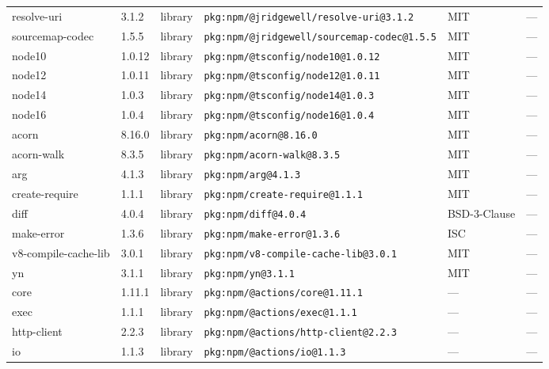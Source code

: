 \documentclass[11pt,a4paper]{article}
\begin{document}
\begin{longtable}{|p{4cm}|p{2cm}|p{1.6cm}|p{5cm}|p{1.5cm}|p{3.5cm}|}
\raggedright resolve-uri & 3.1.2 & library & \small\texttt{pkg:npm/@jridgewell/resolve-uri@3.1.2} & MIT & \small — \\
\raggedright sourcemap-codec & 1.5.5 & library & \small\texttt{pkg:npm/@jridgewell/sourcemap-codec@1.5.5} & MIT & \small — \\
\raggedright node10 & 1.0.12 & library & \small\texttt{pkg:npm/@tsconfig/node10@1.0.12} & MIT & \small — \\
\raggedright node12 & 1.0.11 & library & \small\texttt{pkg:npm/@tsconfig/node12@1.0.11} & MIT & \small — \\
\raggedright node14 & 1.0.3 & library & \small\texttt{pkg:npm/@tsconfig/node14@1.0.3} & MIT & \small — \\
\raggedright node16 & 1.0.4 & library & \small\texttt{pkg:npm/@tsconfig/node16@1.0.4} & MIT & \small — \\
\raggedright acorn & 8.16.0 & library & \small\texttt{pkg:npm/acorn@8.16.0} & MIT & \small — \\
\raggedright acorn-walk & 8.3.5 & library & \small\texttt{pkg:npm/acorn-walk@8.3.5} & MIT & \small — \\
\raggedright arg & 4.1.3 & library & \small\texttt{pkg:npm/arg@4.1.3} & MIT & \small — \\
\raggedright create-require & 1.1.1 & library & \small\texttt{pkg:npm/create-require@1.1.1} & MIT & \small — \\
\raggedright diff & 4.0.4 & library & \small\texttt{pkg:npm/diff@4.0.4} & BSD-3-Clause & \small — \\
\raggedright make-error & 1.3.6 & library & \small\texttt{pkg:npm/make-error@1.3.6} & ISC & \small — \\
\raggedright v8-compile-cache-lib & 3.0.1 & library & \small\texttt{pkg:npm/v8-compile-cache-lib@3.0.1} & MIT & \small — \\
\raggedright yn & 3.1.1 & library & \small\texttt{pkg:npm/yn@3.1.1} & MIT & \small — \\
\raggedright core & 1.11.1 & library & \small\texttt{pkg:npm/@actions/core@1.11.1} & — & \small — \\
\raggedright exec & 1.1.1 & library & \small\texttt{pkg:npm/@actions/exec@1.1.1} & — & \small — \\
\raggedright http-client & 2.2.3 & library & \small\texttt{pkg:npm/@actions/http-client@2.2.3} & — & \small — \\
\raggedright io & 1.1.3 & library & \small\texttt{pkg:npm/@actions/io@1.1.3} & — & \small — \\

\end{longtable}
\end{document}
